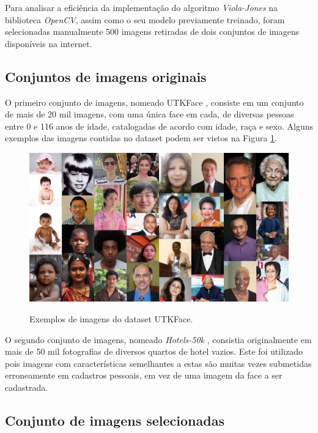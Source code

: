 Para analisar a eficiência da implementação do algoritmo \textit{Viola-Jones} na biblioteca \textit{OpenCV}, assim como o seu modelo previamente treinado, foram selecionadas manualmente 500 imagens retiradas de dois conjuntos de imagens disponíveis na internet.

\subsection{Conjuntos de imagens originais}

O primeiro conjunto de imagens, nomeado UTKFace \cite{utkface}, consiste em um conjunto de mais de 20 mil imagens, com uma única face em cada, de diversas pessoas entre 0 e 116 anos de idade, catalogadas de acordo com idade, raça e sexo. Alguns exemplos das imagens contidas no dataset podem ser vistos na Figura \ref{fig:exemplos-utk}.

\begin{figure}[htb]
    \centering
    \caption{Exemplos de imagens do dataset UTKFace.}
    \includegraphics[scale=.3]{figs/exemplos-utk.png}
    \label{fig:exemplos-utk}
\end{figure}

O segundo conjunto de imagens, nomeado \textit{Hotels-50k} \cite{hotels50k-article}, consistia originalmente em mais de 50 mil fotografias de diversos quartos de hotel vazios. Este foi utilizado pois imagens com características semelhantes a estas são muitas vezes submetidas erroneamente em cadastros pessoais, em vez de uma imagem da face a ser cadastrada.

\subsection{Conjunto de imagens selecionadas}


